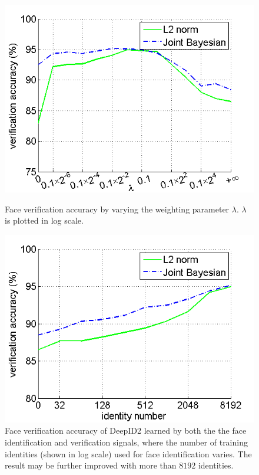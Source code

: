 \documentclass{article} %
\begin{document}
\begin{figure}[t]
\begin{minipage}[t]{0.5\linewidth}
\centering
  \includegraphics[width=\textwidth]{picture/Picture4.png}
  \vspace{-0.25in}
  \caption{Face verification accuracy by varying the weighting parameter $\lambda$. $\lambda$ is plotted in log scale.}
  \label{fig:iv}
\end{minipage}
\hspace{0.2cm}
\begin{minipage}[t]{0.5\linewidth}
 \centering
  \includegraphics[width=\textwidth]{picture/Picture5.png}
  \vspace{-0.25in}
  \caption{Face verification accuracy of DeepID2 learned by both the the face identification and verification signals, where the number of training identities (shown in log scale) used for face identification varies. The result may be further improved with more than $8192$ identities.}
  \label{fig:classnum}
\end{minipage}
\end{figure}
\end{document}
